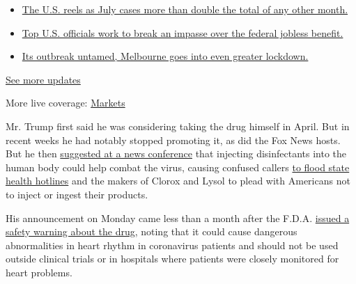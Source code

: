\begin{itemize}
\tightlist
\item
  \href{https://www.nytimes.com/2020/08/01/world/coronavirus-covid-19.html?action=click\&pgtype=Article\&state=default\&region=MAIN_CONTENT_1\&context=storylines_live_updates\#link-34047410}{The
  U.S. reels as July cases more than double the total of any other
  month.}
\item
  \href{https://www.nytimes.com/2020/08/01/world/coronavirus-covid-19.html?action=click\&pgtype=Article\&state=default\&region=MAIN_CONTENT_1\&context=storylines_live_updates\#link-780ec966}{Top
  U.S. officials work to break an impasse over the federal jobless
  benefit.}
\item
  \href{https://www.nytimes.com/2020/08/01/world/coronavirus-covid-19.html?action=click\&pgtype=Article\&state=default\&region=MAIN_CONTENT_1\&context=storylines_live_updates\#link-2bc8948}{Its
  outbreak untamed, Melbourne goes into even greater lockdown.}
\end{itemize}

\href{https://www.nytimes.com/2020/08/01/world/coronavirus-covid-19.html?action=click\&pgtype=Article\&state=default\&region=MAIN_CONTENT_1\&context=storylines_live_updates}{See
more updates}

More live coverage:
\href{https://www.nytimes.com/live/2020/07/31/business/stock-market-today-coronavirus?action=click\&pgtype=Article\&state=default\&region=MAIN_CONTENT_1\&context=storylines_live_updates}{Markets}

Mr. Trump first said he was considering taking the drug himself in
April. But in recent weeks he had notably stopped promoting it, as did
the Fox News hosts. But he then
\href{https://www.nytimes.com/2020/04/26/us/politics/trump-disinfectant-coronavirus.html}{suggested
at a news conference} that injecting disinfectants into the human body
could help combat the virus, causing confused callers
\href{https://slack-redir.net/link?url=https\%3A\%2F\%2Fwww.nytimes.com\%2F2020\%2F04\%2F24\%2Fus\%2Fpolitics\%2Ftrump-inject-disinfectant-bleach-coronavirus.html}{to
flood state health hotlines} and the makers of Clorox and Lysol to plead
with Americans not to inject or ingest their products.

His announcement on Monday came less than a month after the F.D.A.
\href{https://www.nytimes.com/2020/04/24/health/fda-hydroxychloroquine-coronavirus.html?smid=nytcore-ios-share}{issued
a safety warning about the drug}, noting that it could cause dangerous
abnormalities in heart rhythm in coronavirus patients and should not be
used outside clinical trials or in hospitals where patients were closely
monitored for heart problems.

